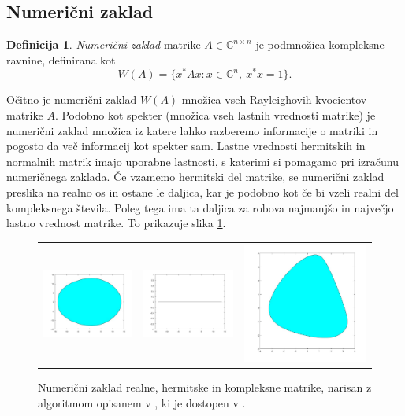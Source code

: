 \documentclass[12pt,a4paper]{amsart}
\theoremstyle{definition}
\newtheorem{definicija}{Definicija}[section]
\theoremstyle{plain}
\newcommand{\C}{\mathbb C}
\begin{document}
\subsection{Numerični zaklad}
\begin{definicija}
\emph{Numerični zaklad} matrike $A \in \C^{n\times n}$ je pod\-mno\-ži\-ca kompleksne ravnine, definirana kot
$$W(A)=\{x^\ast Ax\! : x \in \C^n,\ x^\ast x=1\}.$$
\end{definicija}
Očitno je numerični zaklad $W(A)$ množica vseh Rayleighovih kvocientov matrike $A$. Podobno kot spekter (množica vseh lastnih vrednosti matrike) je numerični zaklad množica iz katere lahko razberemo informacije o matriki in pogosto da več informacij kot spekter sam.
Lastne vrednosti hermitskih in normalnih matrik imajo uporabne lastnosti, s katerimi si pomagamo pri izračunu numeričnega zaklada.
Če vzamemo hermitski del matrike, se numerični zaklad preslika na realno os in ostane le daljica, kar je podobno kot če bi vzeli realni del kompleksnega števila. Poleg tega ima ta daljica za robova najmanjšo in največjo lastno vrednost matrike.
To prikazuje slika \ref{fig:zaklad}.\\
\begin{figure} [h]
\begin{tabular}{lll}
\includegraphics[width=.3\textwidth]{real.jpg}
&
\includegraphics[width=.3\textwidth]{hermit.jpg}
&
\includegraphics[width=.3\textwidth]{kompleks.jpg}
\end{tabular}
\caption{Numerični zaklad realne, hermitske in kompleksne matrike, narisan z algoritmom opisanem v \cite{zaloga}, ki je dostopen v \cite{nr}.}
\label{fig:zaklad}
\end{figure}
\end{document}
